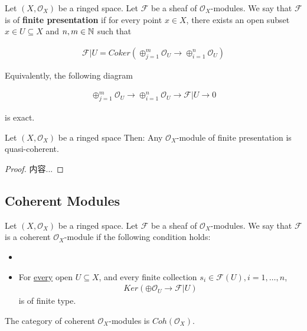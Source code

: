 \documentclass[Total.tex]{subfiles}
\begin{document}
			\begin{Def}
				Let $(X,\mathcal{O}_X)$ be a ringed space. Let $\mathcal{F}$ be a sheaf of $\mathcal{O}_X$-modules. We say that $\mathcal{F}$ is of \textbf{finite presentation} if for every point $x\in X$, there exists an open subset $x\in U\subseteq X$ and $n,m\in \mathbb{N}$ such that
				
				\begin{gather*}
					\mathcal{F}|U=Coker(\oplus_{j=1}^m \mathcal{O}_U\rightarrow \oplus_{i=1}^n \mathcal{O}_U)
				\end{gather*}
			\end{Def}
			
			Equivalently, the following diagram
			
			\begin{gather*}
				\oplus_{j=1}^m \mathcal{O}_U\rightarrow \oplus_{i=1}^n \mathcal{O}_U\rightarrow \mathcal{F}|U\rightarrow 0
			\end{gather*}
			
			is exact.
			
			\begin{lemma}
				Let $(X,\mathcal{O}_X)$ be a ringed space Then: Any $\mathcal{O}_X$-module of finite presentation is quasi-coherent.
			\end{lemma}
			
			\begin{proof}
				内容...
			\end{proof}
			
			\subsection{Coherent Modules}
			
			\begin{Def}
				Let $(X,\mathcal{O}_X)$ be a ringed space. Let $\mathcal{F}$ be a sheaf of $\mathcal{O}_X$-modules. We say that $\mathcal{F}$ is a coherent $\mathcal{O}_X$-module if the following condition holds:
				\begin{itemize}
					\item 
					\item For \underline{every} open $U\subseteq X$, and every finite collection $s_i\in \mathcal{F}(U),i=1,\dots,n$,
					\begin{gather*}
						Ker(\oplus \mathcal{O}_U\rightarrow \mathcal{F}|U)
					\end{gather*}
					is of finite type.
				\end{itemize}
				The category of coherent $\mathcal{O}_X$-modules is $Coh(\mathcal{O}_X)$.
			\end{Def}
			
\end{document}
